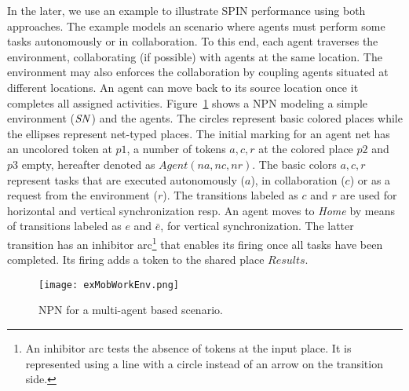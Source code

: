 \documentclass{llncs}
\begin{document}
In the later, we use an example to illustrate SPIN performance using both approaches. The example models an scenario where agents must perform some tasks autonomously or in collaboration. To this end, each agent traverses the environment, collaborating (if possible) with agents at the same location. The environment may also enforces the collaboration by coupling agents situated at different locations. An agent can move back to its source location once it completes all assigned activities. Figure~\ref{figEx1} shows a NPN modeling a simple environment (${\it SN}$) and the agents. The circles represent basic colored places while the ellipses represent net-typed places. The initial marking for an agent net has an uncolored token at $p1$, a number of tokens $a,c,r$ at the colored place $p2$ and $p3$ empty, hereafter denoted as $Agent(na, nc, nr)$. The basic colors  $a,c,r$ represent tasks that are executed autonomously ($a$), in collaboration ($c$) or as a request from the environment ($r$). The  transitions labeled as $c$ and $r$ are used for horizontal and vertical synchronization resp. An agent moves to \emph{Home} by means of transitions labeled as $e$ and $\bar{e}$, for vertical synchronization. The latter transition has an inhibitor arc\footnote{An inhibitor arc tests the absence of tokens at the input place.
It is represented using a line with a circle instead of an arrow on the transition side.} that enables its firing once all tasks have been completed. Its firing adds a token to the shared place $Results$.

\begin{figure}
\begin{center}
\texttt{[image: exMobWorkEnv.png]}
\end{center}
\vspace{-10pt}
\caption{NPN for a multi-agent based scenario.}
\label{figEx1}
\end{figure}
\end{document}
